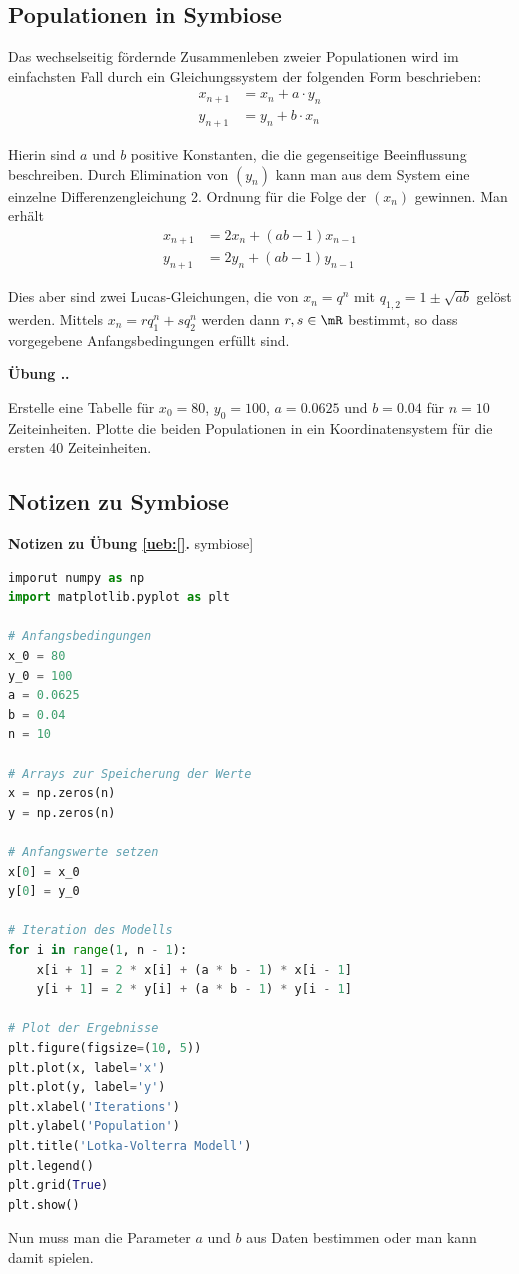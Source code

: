 \documentclass[%
11pt,%
twoside,%
titlepage,%
german,%
headsepline%
]{scrartcl}
\newcommand{\faEyeLightGray}{\textcolor{lightgray}{\faEye}} %
\newcommand{\concatueb}[1]{ueb:#1}%
\newcommand{\concatlsg}[1]{lsg:#1}%
\newcounter{uebcounter}[section]
\renewcommand{\theuebcounter}{\thesection.\arabic{uebcounter}}  %
\newenvironment{lsg}[1]{%
    \par\noindent\textbf{Notizen zu Übung \ref{\concatueb{#1}}.}%
    \label{\concatlsg{#1}}
}{%
    \par%
}
\newenvironment{uebenv}[1]{%
    \refstepcounter{uebcounter}
    \par\noindent\textbf{Übung \theuebcounter.}%
    \label{\concatueb{#1}}\hfill\hyperref[\concatlsg{#1}]{\faEyeLightGray}\par
}{%
    \par
}
\begin{document}
\subsection{Populationen in Symbiose}
Das wechselseitig fördernde Zusammenleben zweier Populationen wird im einfachsten Fall durch ein Gleichungssystem der folgenden Form beschrieben:
\begin{align*}
x_{n+1} &= x_n+a\cdot y_n\\
y_{n+1} &= y_n+b\cdot x_n
\end{align*}

Hierin sind $a$ und $b$ positive Konstanten, die die gegenseitige Beeinflussung beschreiben. Durch Elimination von $(y_n)$ kann man aus dem System eine einzelne Differenzengleichung 2. Ordnung für die Folge der $(x_n)$ gewinnen. Man erhält
\begin{align*}
x_{n+1} &= 2x_n+(ab-1)x_{n-1}\\
y_{n+1} &= 2y_n+(ab-1)y_{n-1}
\end{align*}

Dies aber sind zwei Lucas-Gleichungen, die von $x_n = q^n$ mit $q_{1,2} = 1\pm\sqrt{ab}$ gelöst werden. Mittels $x_n=rq_1^n+sq_2^n$ werden dann $r,s\in\mR$ bestimmt, so dass vorgegebene Anfangsbedingungen erfüllt sind.

\begin{uebenv}{symbiose}
Erstelle eine Tabelle für $x_0=80$, $y_0=100$, $a=0.0625$ und $b=0.04$ für $n=10$ Zeiteinheiten. Plotte die beiden Populationen in ein Koordinatensystem für die ersten 40 Zeiteinheiten.
\end{uebenv}

\clearpage

\subsection{Notizen zu Symbiose}

\begin{lsg}[symbiose]
    \begin{lstlisting}[language=python]
imporut numpy as np
import matplotlib.pyplot as plt

# Anfangsbedingungen
x_0 = 80
y_0 = 100
a = 0.0625
b = 0.04
n = 10

# Arrays zur Speicherung der Werte
x = np.zeros(n)
y = np.zeros(n)

# Anfangswerte setzen
x[0] = x_0
y[0] = y_0

# Iteration des Modells
for i in range(1, n - 1):
    x[i + 1] = 2 * x[i] + (a * b - 1) * x[i - 1]
    y[i + 1] = 2 * y[i] + (a * b - 1) * y[i - 1]

# Plot der Ergebnisse
plt.figure(figsize=(10, 5))
plt.plot(x, label='x')
plt.plot(y, label='y')
plt.xlabel('Iterations')
plt.ylabel('Population')
plt.title('Lotka-Volterra Modell')
plt.legend()
plt.grid(True)
plt.show()

    \end{lstlisting}

    Nun muss man die Parameter $a$ und $b$ aus Daten bestimmen oder man kann damit spielen.
\end{lsg}
\end{document}
